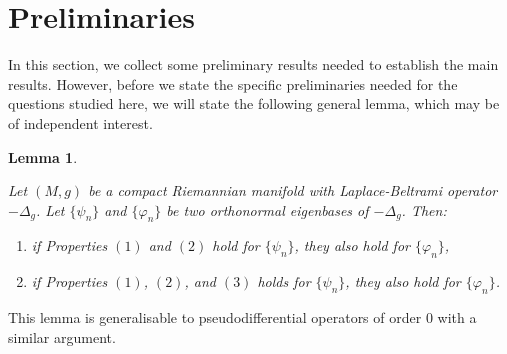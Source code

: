 \documentclass[10pt,a4paper]{amsart}
\renewcommand{\phi}{\varphi}
\newcommand{\1}{\mathrm{\mathbf{1}}}
\numberwithin{equation}{section}
\newtheorem{lemma}[thm]{Lemma}
\begin{document}
\section{Preliminaries}
In this section, we collect some preliminary results needed to establish the main results. However, before we state the specific preliminaries needed for the questions studied here, we will state the following general lemma, which may be of independent interest.

\begin{lemma}\label{LE:exstension_to_other_basis}

    Let $(M,g)$ be a compact Riemannian manifold with Laplace-Beltrami operator $-\Delta_g$. Let $\{ \psi_n \}$ and $\{ \phi_n \}$ be two orthonormal eigenbases of $-\Delta_g$. Then:
    \begin{enumerate}
        \item [$(a)$] if Properties $(1)$ and $(2)$ hold for $\{ \psi_n\}$, they also hold for $\{ \phi_n \}$,
        \item [$(b)$] if Properties $(1)$, $(2)$, and $(3)$ holds for $\{ \psi_n\}$, they also hold for $\{ \phi_n \}$.
    \end{enumerate}
    
\end{lemma}
This lemma is generalisable to pseudodifferential operators of order $0$ with a similar argument.
\end{document}
